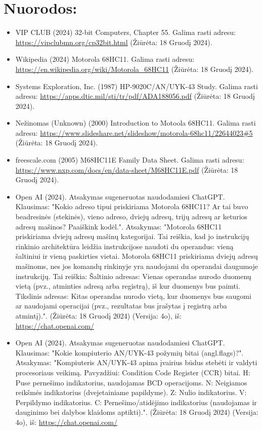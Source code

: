 \documentclass[a4paper,12pt]{article}
\begin{document}
\section{Nuorodos:}
\begin{itemize}
    \item VIP CLUB (2024) 32-bit Computers, Chapter 55. Galima rasti adresu: \url{https://vipclubmn.org/cp32bit.html} (Žiūrėta: 18 Gruodį 2024).
    \item Wikipedia (2024) Motorola 68HC11. Galima rasti adresu: \url{https://en.wikipedia.org/wiki/Motorola_68HC11} (Žiūrėta: 18 Gruodį 2024).
    \item Systems Exploration, Inc. (1987) HP-9020C/AN/UYK-43 Study. Galima rasti adresu: \url{https://apps.dtic.mil/sti/tr/pdf/ADA188056.pdf} (Žiūrėta: 18 Gruodį 2024).
    \item Nežinomas (Unknown) (2000) Introduction to Motoola 68HC11. Galima rasti adresu: \url{https://www.slideshare.net/slideshow/motorola-68hc11/22644023#5} (Žiūrėta: 18 Gruodį 2024).
    \item freescale.com (2005) M68HC11E Family Data Sheet. Galima rasti adresu: \url{https://www.nxp.com/docs/en/data-sheet/M68HC11E.pdf} (Žiūrėta: 18 Gruodį 2024).
    \item Open AI (2024). Atsakymas sugeneruotas naudodamiesi ChatGPT. Klausimas: "Kokio adreso tipui priskiriama Motorola 68HC11? Ar tai buvo beadresinės (stekinės), vieno adreso, dviejų adresų,  trijų adresų ar keturios adresų mašinos? Paaiškink kodėl.". Atsakymas: "Motorola 68HC11 priskiriama dviejų adresų mašinų kategorijai. Tai reiškia, kad jo instrukcijų rinkinio architektūra leidžia instrukcijose naudoti du operandus: vieną šaltiniui ir vieną paskirties vietai. Motorola 68HC11 priskiriama dviejų adresų mašinoms, nes jos komandų rinkinyje yra naudojami du operandai daugumoje instrukcijų. Tai reiškia: Šaltinio adresas: Vienas operandas nurodo duomenų vietą (pvz., atminties adresą arba registrą), iš kur duomenys bus paimti. Tikslinis adresas: Kitas operandas nurodo vietą, kur duomenys bus saugomi ar naudojami operacijai (pvz., rezultatas bus įrašytas į registrą arba atmintį).". (Žiūrėta: 18 Gruodį 2024) (Versija: 4o), iš: \url{https://chat.openai.com/}
    \item Open AI (2024). Atsakymas sugeneruotas naudodamiesi ChatGPT. Klausimas: "Kokie kompiuterio AN/UYK-43 požymių bitai (angl.flags)?". Atsakymas: "Kompiuteris AN/UYK-43 apima įvairius būdus stebėti ir valdyti procesoriaus veikimą. Pavyzdžiui: Condition Code Register (CCR) bitai. H: Puse pernešimo indikatorius, naudojamas BCD operacijoms. N: Neigiamos reikšmės indikatorius (dvejetainiame papildyme). Z: Nulio indikatorius. V: Perpildymo indikatorius. C: Pernešimo/atidėjimo indikatorius (naudojamas ir dauginimo bei dalybos klaidoms aptikti).". (Žiūrėta: 18 Gruodį 2024) (Versija: 4o), iš: \url{https://chat.openai.com/}
\end{itemize}
\end{document}
